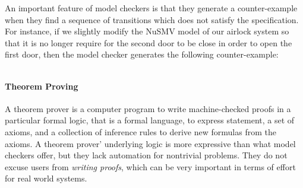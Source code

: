 \begin{example}
  \inputminted[linenos=false]{coq}{Listings/Airlock-out.nusmv}

  An important feature of model checkers is that they generate a counter-example
  when they find a sequence of transitions which does not satisfy the
  specification.
  For instance, if we slightly modify the NuSMV model of our airlock system so
  that it is no longer require for the second door to be close in order to open
  the first door, then the model checker generates the following
  counter-example:

  \inputminted[linenos=false]{coq}{Listings/Airlock-counter.nusmv}
\end{example}

\paragraph{Theorem Proving}
%
A theorem prover is a computer program to write machine-checked proofs in a
particular formal logic, that is a formal language, to express statement, a set
of axioms, and a collection of inference rules to derive new formulas from the
axioms.
%
A theorem prover' underlying logic is more expressive than what model checkers
offer, but they lack automation for nontrivial problems.
%
They do not excuse users from \emph{writing proofs}, which can be very important
in terms of effort for real world systems.


